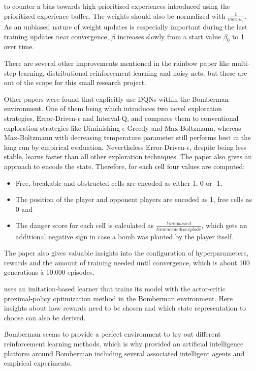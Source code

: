 to counter a bias towards high prioritized experiences introduced using the prioritized experience buffer. The weights should also be normalized with $\frac{1}{max_i w_i}$. As an unbiased nature of weight updates is esspecially important during the last training updates near convergence, $\beta$ increases slowly from a start value $\beta_0$ to 1 over time. 

There are several other improvements mentioned in the rainbow paper \cite{Hessel2017} like multi-step learning, distributional reinforcement learning and noisy nets, but these are out of the scope for this small research project. 

Other papers were found that explicitly use DQNs within the Bomberman environment. One of them being \cite{Kormelink2018} which introduces two novel exploration strategies, Error-Driven-$\epsilon$ and Interval-Q, and compares them to conventional exploration strategies like Diminishing $\epsilon$-Greedy and Max-Boltzmann, whereas Max-Boltzmann with decreasing temperature parameter still performs best in the long run by empirical evaluation. Nevertheless Error-Driven-$\epsilon$, despite being less stable, learns faster than all other exploration techniques. The paper also gives an approach to encode the state. Therefore, for each cell four values are computed:

\begin{itemize}
	\item Free, breakable and obstructed cells are encoded as either 1, 0 or -1,
	\item The position of the player and opponent players are encoded as 1, free cells as 0 and
	\item The danger score for each cell is calculated as $\frac{time passed}{time needed to explode}$, which gets an additional negative sign in case a bomb was planted by the player itself.
\end{itemize}

The paper also gives valuable insights into the configuration of hyperparameters, rewards and the amount of training needed until convergence, which is about 100 generations à 10.000 episodes. 

\cite{Franca2019} uses an imitation-based learner that trains its model with the actor-critic proximal-policy optimization method in the Bomberman environment. Here insights about how rewards need to be chosen and which state representation to choose can also be derived. 

Bomberman seems to provide a perfect environment to try out different reinforcement learning methods, which is why \cite{daCruzLopes2016} provided an artificial intelligence platform around Bomberman including several associated intelligent agents and empirical experiments. 
